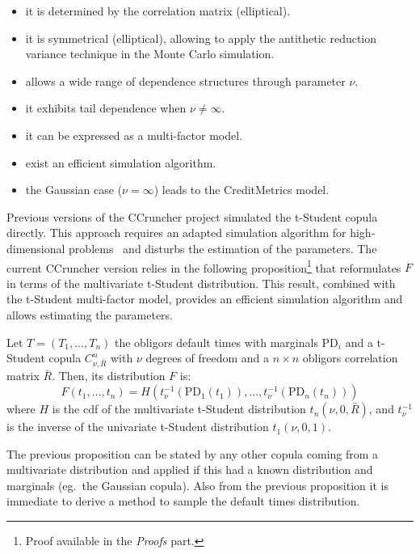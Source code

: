 \documentclass[11pt,fleqn]{book} %
\begin{document}
\begin{itemize}
	\item it is determined by the correlation matrix (elliptical). 
	\item it is symmetrical (elliptical), allowing to 
	apply the antithetic reduction variance technique in the Monte Carlo 
	simulation.
	\item allows a wide range of dependence structures through parameter $\nu$.
	\item it exhibits tail dependence when $\nu \ne \infty$.
	\item it can be expressed as a multi-factor model.
	\item exist an efficient simulation algorithm.
	\item the Gaussian case ($\nu = \infty$) leads to the 
	CreditMetrics\texttrademark{} model.
\end{itemize}

Previous versions of the CCruncher project simulated the t-Student copula 
directly. This approach requires an adapted simulation algorithm for 
high-dimensional problems~\cite{torrent:2012} and disturbs the estimation 
of the parameters. The current CCruncher version relies in the following 
proposition\footnote{Proof available in the \emph{Proofs} part.} that 
reformulates $F$ in terms of the multivariate t-Student distribution. 
This result, combined with the t-Student multi-factor model, provides an 
efficient simulation algorithm and allows estimating the parameters.

\begin{proposition}
	\label{prop:dtd}
	Let $T=(T_1,\dots,T_n)$ the obligors default times with marginals 
	$\text{PD}_i$ and a t-Student copula $C_{\nu,\bar{R}}^n$ with $\nu$
	degrees of freedom and a $n {\times} n$ obligors correlation matrix 
	$\bar{R}$. Then, its distribution $F$ is:
	\begin{displaymath}
		F(t_1,\dots,t_n) = H\left(t_\nu^{-1}(\text{PD}_1(t_1)), \dots, t_\nu^{-1}(\text{PD}_n(t_n))\right)
	\end{displaymath}
	where $H$ is the cdf of the multivariate t-Student distribution 
	$t_n(\nu,0,\bar{R})$, and $t_\nu^{-1}$ is the inverse of the univariate 
	t-Student distribution $t_1(\nu,0,1)$.
\end{proposition}

The previous proposition can be stated by any other copula coming from
a multivariate distribution and applied if this had a known distribution 
and marginals (eg.\ the Gaussian copula). Also from the previous proposition
it is immediate to derive a method to sample the default times distribution.
\end{document}
